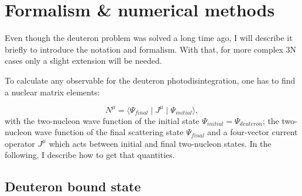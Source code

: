 \chapter{Formalism \& numerical methods}
\label{sec:formalism}

Even though the deuteron problem was solved a long time ago, I will describe it briefly 
to introduce the notation and formalism. 
With that, for more complex 3N cases only a slight 
extension will be needed.

To calculate any observable for the deuteron photodisintegration,
one has to find a nuclear matrix elements:

\begin{equation}
    N^\mu = \langle \Psi_{final} \mid J^\mu \mid \Psi_{initial} \rangle, 
    \label{main}
\end{equation}
with the two-nucleon wave function of the initial state $\Psi_{initial}  = \Psi_{deuteron}$;
the two-nucleon wave function of the final scattering state $\Psi_{final}$ 
and a four-vector current operator $J^\mu$ which acts between initial and final 
two-nucleon states. In the following, I describe how to get that quantities.




\section{Deuteron bound state}
    \label{sec:deut_bound}

